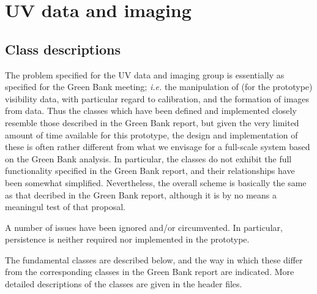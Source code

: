 \chapter{UV data and imaging}

\section {Class descriptions}

The problem specified for the UV data and imaging group is essentially
as specified for the Green Bank meeting; {\it i.e.} the manipulation
of (for the prototype) visibility data, with particular regard to
calibration, and the formation of images from data.  Thus the classes
which have been defined and implemented closely resemble those
described in the Green Bank report, but given the very limited amount
of time available for this prototype, the design and implementation of
these is often rather different from what we envisage for a full-scale
system based on the Green Bank analysis.  In particular, the classes
do not exhibit the full functionality specified in the Green Bank
report, and their relationships have been somewhat simplified.
Nevertheless, the overall scheme is basically the same as that
decribed in the Green Bank report, although it is by no means a
meaningul test of that proposal.

A number of issues have been ignored and/or circumvented.  In
particular, persistence is neither required nor implemented in the
prototype.

The fundamental classes are described below, and the way in which
these differ from the corresponding classes in the Green Bank report
are indicated.  More detailed descriptions of the classes are given in
the header files.

